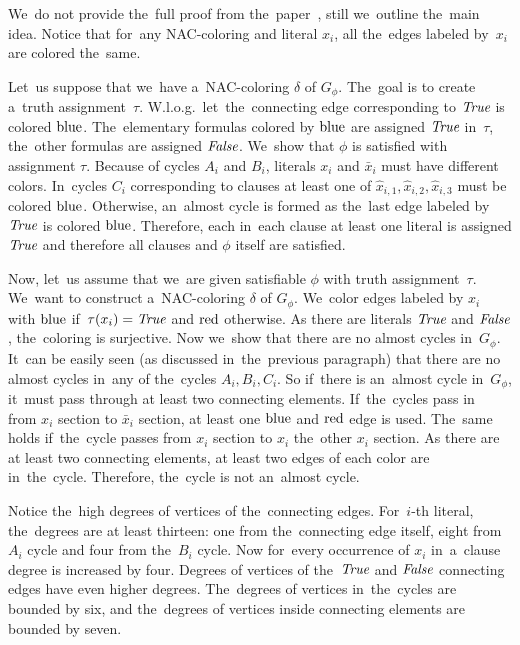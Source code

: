 We~do not provide the~full proof from the~paper~\cite{np_complete},
still we~outline the~main idea.
Notice that for~any NAC-coloring and literal \( x_i \),
all the~edges labeled by~\( x_i \) are colored the~same.

Let~us suppose that we~have a~NAC-coloring \( \delta \) of \( G_\phi \).
The~goal is to create a~truth assignment~\( \tau \).
W.l.o.g.\ let~the~connecting edge corresponding to \( \textit{True} \) is colored \( \text{blue} \).
The~elementary formulas colored by \( \text{blue} \) are assigned \( \textit{True} \) in~\( \tau \),
the~other formulas are assigned \( \textit{False} \).
We~show that \( \phi \) is satisfied with assignment \( \tau \).
Because of cycles \( A_i \) and \( B_i \), literals \( x_i \) and \( \bar{x}_i \)
must have different colors. In~cycles \( C_i \) corresponding to clauses
at least one of \( \hat{x}_{i,1}, \hat{x}_{i,2}, \hat{x}_{i,3} \) must be colored \( \text{blue} \).
Otherwise, an~almost cycle is formed as the~last edge labeled by \( \textit{True} \) is colored \( \text{blue} \).
Therefore, each in~each clause at least one literal is assigned \( \textit{True} \)
and therefore all clauses and \( \phi \) itself are satisfied.

Now, let~us assume that we~are given satisfiable \( \phi \)
with truth assignment~\( \tau \).
We~want to construct a~NAC-coloring \( \delta \) of \( G_\phi \).
We~color edges labeled by \( x_i \) with \( \text{blue} \) if~\( \tau(x_i) = \textit{True} \)
and \( \text{red} \) otherwise.
As there are literals \( \textit{True} \) and \( \textit{False} \), the~coloring is surjective.
Now we~show that there are no almost cycles in~\( G_\phi \).
It~can be easily seen (as discussed in~the~previous paragraph)
that there are no almost cycles in~any of the~cycles \( A_i, B_i, C_i \).
So if~there is an~almost cycle in~\( G_\phi \), it~must pass through
at least two connecting elements.
If~the~cycles pass in~
from \( x_i \) section to \( \bar{x}_i \) section, at least one \( \text{blue} \)
and \( \text{red} \) edge is used. The~same holds if~the~cycle passes
from \( x_i \) section to \( x_i \) the~other \( x_i \) section.
As there are at least two connecting elements, at least two edges of each color are in~the~cycle.
Therefore, the~cycle is not an~almost cycle.

Notice the~high degrees of vertices of the~connecting edges.
For~\( i \)-th literal, the~degrees are at least thirteen:
one from the~connecting edge itself,
eight from \( A_i \) cycle and four from the~\( B_i \) cycle.
Now for~every occurrence of \( x_i \) in~a~clause degree is increased by four.
%
Degrees of vertices of the~\( \textit{True} \) and \( \textit{False} \) connecting edges
have even higher degrees.
%
The~degrees of vertices in~the~cycles are bounded by six,
and the~degrees of vertices inside connecting elements are bounded by seven.


